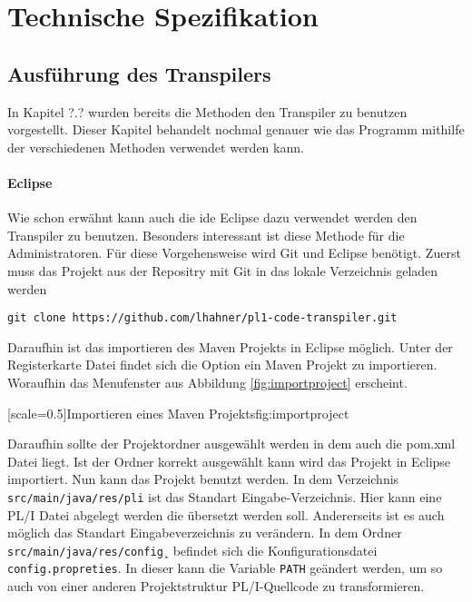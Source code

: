 {\section{Technische Spezifikation}
\subsection{Ausführung des Transpilers}

In Kapitel ?.? wurden bereits die Methoden den Transpiler zu benutzen vorgestellt.
Dieser Kapitel behandelt nochmal genauer wie das Programm mithilfe der verschiedenen Methoden 
verwendet werden kann.

\paragraph{Eclipse}
Wie schon erwähnt kann auch die \ac{ide} Eclipse dazu verwendet werden
den Transpiler zu benutzen. Besonders interessant ist diese Methode für die Administratoren.
Für diese Vorgehensweise wird Git und Eclipse benötigt.
Zuerst muss das Projekt aus der Repositry mit Git in das lokale Verzeichnis geladen werden

\begin{lstlisting}[language=PL/I, caption=Deklaration einer Varibale des Typs Decimal, label={lst:decimal}]
git clone https://github.com/lhahner/pl1-code-transpiler.git
\end{lstlisting}

Daraufhin ist das importieren des Maven Projekts in Eclipse möglich.
Unter der Registerkarte Datei findet sich die Option ein Maven Projekt zu importieren.
Woraufhin das Menufenster aus Abbildung \ref{fig:importproject} erscheint.

[scale=0.5]{Importieren eines Maven Projekts}{fig:importproject}
\pagebreak

Daraufhin sollte der Projektordner ausgewählt werden in dem auch die pom.xml Datei liegt.
Ist der Ordner korrekt ausgewählt kann wird das Projekt in Eclipse importiert.
Nun kann das Projekt benutzt werden.
In dem Verzeichnis \verb+src/main/java/res/pli+
ist das Standart Eingabe-Verzeichnis. Hier kann eine PL/I Datei
abgelegt werden die übersetzt werden soll. 
Andererseits ist es auch möglich das Standart Eingabeverzeichnis
zu verändern. In dem Ordner \verb+src/main/java/res/config+¸
befindet sich die Konfigurationsdatei \verb+config.propreties+.
In dieser kann die Variable \verb+PATH+ geändert werden,
um so auch von einer anderen Projektstruktur PL/I-Quellcode
zu transformieren.

}
